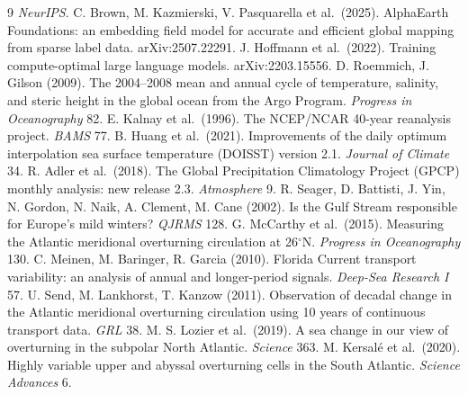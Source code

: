 \documentclass[10pt]{article}
\begin{document}
\begin{thebibliography}{9}
\emph{NeurIPS}.
 C. Brown, M. Kazmierski, V. Pasquarella et al.\
(2025). AlphaEarth Foundations: an embedding field model for accurate
and efficient global mapping from sparse label data. arXiv:2507.22291.
\bibitem{chinchilla} J. Hoffmann et al.\ (2022). Training
compute-optimal large language models. arXiv:2203.15556.
 D. Roemmich, J. Gilson (2009). The 2004--2008 mean and
annual cycle of temperature, salinity, and steric height in the global
ocean from the Argo Program. \emph{Progress in Oceanography} 82.
\bibitem{kalnay} E. Kalnay et al.\ (1996). The NCEP/NCAR 40-year
reanalysis project. \emph{BAMS} 77.
 B. Huang et al.\ (2021). Improvements of the daily
optimum interpolation sea surface temperature (DOISST) version 2.1.
\emph{Journal of Climate} 34.
 R. Adler et al.\ (2018). The Global Precipitation
Climatology Project (GPCP) monthly analysis: new release 2.3.
\emph{Atmosphere} 9.
 R. Seager, D. Battisti, J. Yin, N. Gordon,
N. Naik, A. Clement, M. Cane (2002). Is the Gulf Stream responsible for
Europe's mild winters? \emph{QJRMS} 128.
 G. McCarthy et al.\ (2015). Measuring the Atlantic
meridional overturning circulation at 26$^\circ$N. \emph{Progress in
Oceanography} 130.
 C. Meinen, M. Baringer, R. Garcia (2010). Florida
Current transport variability: an analysis of annual and longer-period
signals. \emph{Deep-Sea Research I} 57.
 U. Send, M. Lankhorst, T. Kanzow (2011). Observation of
decadal change in the Atlantic meridional overturning circulation using
10 years of continuous transport data. \emph{GRL} 38.
 M. S. Lozier et al.\ (2019). A sea change in our view
of overturning in the subpolar North Atlantic. \emph{Science} 363.
\bibitem{kersale} M. Kersal\'e et al.\ (2020). Highly variable upper
and abyssal overturning cells in the South Atlantic. \emph{Science
Advances} 6.
\end{thebibliography}
\end{document}
